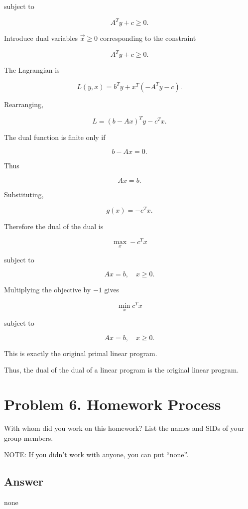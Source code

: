 \documentclass[
	12pt,
]{fphw}
\begin{document}
subject to

\[
A^T y + c \ge 0.
\]

Introduce dual variables $\vec{x} \ge 0$ corresponding to the constraint

\[
A^T y + c \ge 0.
\]

The Lagrangian is

\[
L(y,x)
=
b^T y + x^T(-A^T y - c).
\]

Rearranging,

\[
L
=
(b - A x)^T y - c^T x.
\]

The dual function is finite only if

\[
b - A x = 0.
\]

Thus

\[
Ax = b.
\]

Substituting,

\[
g(x) = -c^T x.
\]

Therefore the dual of the dual is

\[
\max_x -c^T x
\]

subject to

\[
Ax = b, \quad x \ge 0.
\]

Multiplying the objective by $-1$ gives

\[
\min_x c^T x
\]

subject to

\[
Ax = b, \quad x \ge 0.
\]

This is exactly the original primal linear program.

Thus, the dual of the dual of a linear program is the original linear program.


\section*{Problem 6. Homework Process}


With whom did you work on this homework? List the names and SIDs of your group members.

NOTE: If you didn’t work with anyone, you can put “none”.

\subsection*{Answer}
none
\end{document}
